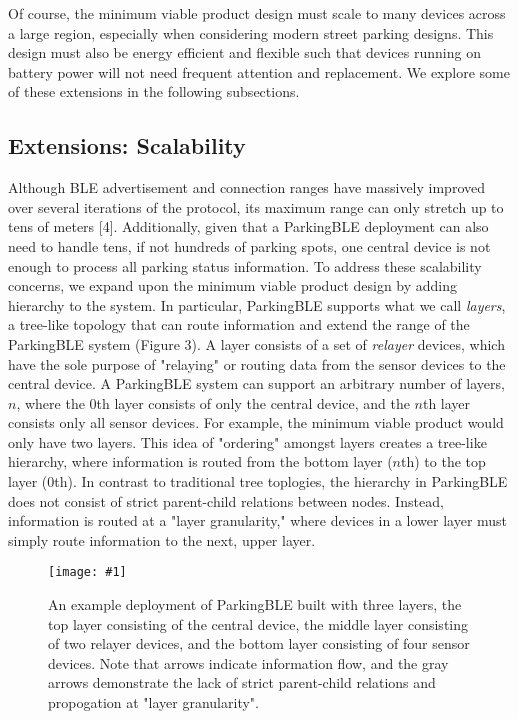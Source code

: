 \documentclass[sigconf]{acmart}
\def\mediumcolfig#1{\texttt{[image: \#1]}}
\begin{document}
Of course, the minimum viable product design must scale to many devices across
a large region, especially when considering modern street parking designs. This
design must also be energy efficient and flexible such that devices running on
battery power will not need frequent attention and replacement. We explore
some of these extensions in the following subsections.

\subsection{Extensions: Scalability}
Although BLE advertisement and connection ranges have massively improved over
several iterations of the protocol, its maximum range can only stretch up to
tens of meters [4]. Additionally, given that a ParkingBLE deployment can also need
to handle tens, if not hundreds of parking spots, one central device is not
enough to process all parking status information. To address these scalability
concerns, we expand upon the minimum viable product design by adding hierarchy
to the system. In particular, ParkingBLE supports what we call \textit{layers},
a tree-like topology that can route information and extend the range of the
ParkingBLE system (Figure 3). A layer consists of a set of \textit{relayer}
devices, which have the sole purpose of "relaying" or routing data from the
sensor devices to the central device. A ParkingBLE system can support an
arbitrary number of layers, $n$, where the 0th layer consists of only the
central device, and the $n$th layer consists only all sensor devices. For
example, the minimum viable product would only have two layers. This idea of
"ordering" amongst layers creates a tree-like hierarchy, where information is
routed from the bottom layer ($n$th) to the top layer (0th). In contrast to
traditional tree toplogies, the hierarchy in ParkingBLE does not consist of
strict parent-child relations between nodes. Instead, information is routed
at a "layer granularity," where devices in a lower layer must simply route
information to the next, upper layer. \newline

\begin{figure}
  \centerline{\mediumcolfig{figs/layers.pdf}}
    \caption{An example deployment of ParkingBLE built with three layers,
    the top layer consisting of the central device, the middle layer consisting
    of two relayer devices, and the bottom layer consisting of four sensor
    devices. Note that arrows indicate information flow, and the gray arrows
    demonstrate the lack of strict parent-child relations and propogation
    at "layer granularity".}
    \label{fig:webserver}
\end{figure}
\end{document}
